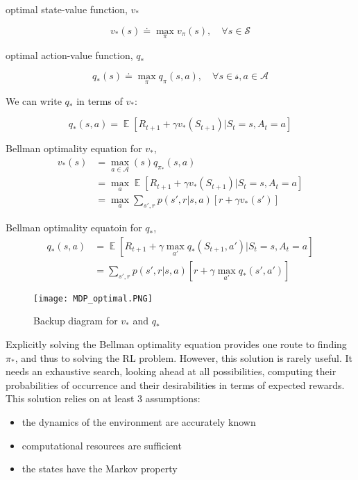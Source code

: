 \documentclass[lang=en,mode=geye,device=normal,color=blue,14pt]{elegantnote}
\DeclareMathOperator*{\E}{\mathbb{E}}
\DeclareMathOperator*{\1}{\mathbbm{1}}
\begin{document}
\begin{definition}
optimal state-value function, $v_*$

$$ v_*(s) \doteq \max_\pi v_\pi(s), \quad \forall s \in \mathcal{S} $$
\end{definition}

\begin{definition}
optimal action-value function, $q_*$

$$ q_*(s) \doteq \max_\pi q_\pi(s,a), \quad \forall s \in \mathcal{s}, a \in \mathcal{A} $$
\end{definition}

We can write $q_*$ in terms of $v_*$:

$$ q_*(s,a) = \E [R_{t+1} + \gamma v_* (S_{t+1}) | S_t = s, A_t = a] $$

\begin{definition}
Bellman optimality equation for $v_*$,
\begin{align*}
v_*(s) & = \max_{a\in\mathcal{A}}(s) q_{\pi_*} (s,a) \\
& = \max_a \E [R_{t+1} + \gamma v_* (S_{t+1}) | S_t = s, A_t = a] \\
& = \max_a \sum_{s',r} p(s',r|s,a)[r+\gamma v_*(s')]
\end{align*}
\end{definition}

\begin{definition}
Bellman optimality equatoin for $q_*$,
\begin{align*}
q_*(s,a) & = \E [R_{t+1} + \gamma \max_{a'} q_*(S_{t+1}, a') | S_t = s, A_t = a] \\
& = \sum_{s',r} p(s',r|s,a)[r+\gamma \max_{a'} q_*(s',a')]
\end{align*}
\end{definition}

\begin{figure}[!h]
  \centering
  \texttt{[image: MDP\_optimal.PNG]}
  \caption{Backup diagram for $v_*$ and $q_*$}
  \label{fig:MDP_optimal}
\end{figure}

Explicitly solving the Bellman optimality equation provides one route to finding $\pi_*$, and thus to solving the RL problem.
However, this solution is rarely useful. It needs an exhaustive search, looking ahead at all possibilities, computing their probabilities of occurrence and their desirabilities in terms of expected rewards.
This solution relies on at least 3 assumptions:
\begin{itemize}
\item the dynamics of the environment are accurately known
\item computational resources are sufficient
\item the states have the Markov property
\end{itemize}
\end{document}
